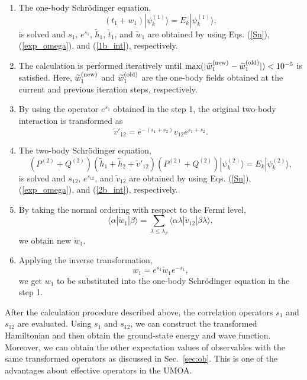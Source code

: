 \documentclass[aps,prc, dvips, twocolumn,groupedaddress,showkeys,showpacs,floatfix,superscriptaddress]{revtex4-1}
\newcommand{\<}{\langle}
\renewcommand{\>}{\rangle}
\begin{document}
\begin{enumerate}
 \item The one-body Schr\"odinger equation,
       \begin{equation}
         (t_{1} + w_{1})|\psi^{(1)}_{k}\> = E_{k}|\psi^{(1)}_{k}\>,
       \end{equation}
       is solved and $s_{1}$,
       $e^{s_{1}}$, $\widetilde{h}_{1}$, $\widetilde{t}_{1}$, and
       $\widetilde{w}_{1}$ are obtained by using Eqs. (\ref{Sn}),
       (\ref{exp_omega}), and (\ref{1b_int}), respectively.
 \item The calculation is performed iteratively until
   $\max(|\widetilde{w}^{({\rm new})}_{1} - \widetilde{w}^{({\rm old})}_{1}|) < 10^{-5}$
   is satisfied.
   Here, $\widetilde{w}^{({\rm new})}_{1}$ and $\widetilde{w}^{({\rm old})}_{1}$ are
   the one-body fields obtained at the current and previous iteration steps, respectively.
 \item By using the operator $e^{s_{1}}$ obtained in the step 1, the original
       two-body interaction is transformed as
       \begin{equation}
	\widetilde{v}'_{12} = e^{-(s_{1}+s_{2})}v_{12}e^{s_{1}+s_{2}}.
       \end{equation}
 \item The two-body Schr\"odinger equation,
       \begin{equation}
         (P^{(2)} + Q^{(2)})(\widetilde{h}_{1}+\widetilde{h}_{2} +
         \widetilde{v}'_{12})(P^{(2)} + Q^{(2)})|\psi^{(2)}_{k}\> = E_{k}|\psi^{(2)}_{k}\>,
       \end{equation}
       is solved and $s_{12}$,
       $e^{s_{12}}$, and $\widetilde{v}_{12}$ are obtained by using
       Eqs. (\ref{Sn}), (\ref{exp_omega}), and (\ref{2b_int}), respectively.
 \item By taking the normal ordering with respect to the Fermi level,
       \begin{equation}
         \label{w1_appr}
	\<\alpha|\widetilde{w}_{1}|\beta\> = \sum_{\lambda \le
	 \lambda_{F}} \<\alpha\lambda | \widetilde{v}_{12}|\beta\lambda\>,
       \end{equation}
       we obtain new $\widetilde{w}_{1}$.
 \item Applying the inverse transformation,
       \begin{equation}
	w_{1} = e^{s_{1}} \widetilde{w}_{1} e^{-s_{1}},
       \end{equation}
       we get $w_{1}$ to be
       substituted into the one-body Schr\"odinger equation in the step 1.
\end{enumerate}
After the calculation procedure described above, the correlation operators $s_{1}$ and $s_{12}$ are evaluated.
Using $s_{1}$ and $s_{12}$, we can construct the transformed Hamiltonian
and then obtain the ground-state energy and wave function.
Moreover, we can obtain the other expectation values of observables with the same transformed
 operators as discussed in Sec.~\ref{sec:ob}.
This is one of the advantages about effective operators in the UMOA.
\end{document}
